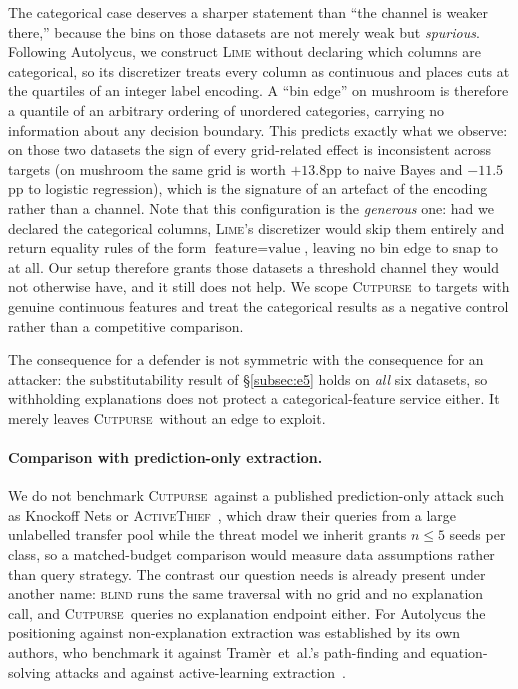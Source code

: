 \documentclass[sigconf,anonymous,review]{acmart}
\newcommand{\sys}{\textsc{Cutpurse}}
\begin{document}
The categorical case deserves a sharper statement than ``the channel is weaker there,'' because the
bins on those datasets are not merely weak but \emph{spurious}. Following Autolycus, we construct
\textsc{Lime} without declaring which columns are categorical, so its discretizer treats every column
as continuous and places cuts at the quartiles of an integer label encoding. A ``bin edge'' on
mushroom is therefore a quantile of an arbitrary ordering of unordered categories, carrying no
information about any decision boundary. This predicts exactly what we observe: on those two datasets
the sign of every grid-related effect is inconsistent across targets (on mushroom the same grid is worth $+13.8$pp to naive Bayes and $-11.5$pp to logistic regression), which is the signature of an
artefact of the encoding rather than a channel. Note that this configuration is the
\emph{generous} one: had we declared the categorical columns, \textsc{Lime}'s discretizer would skip
them entirely and return equality rules of the form $\text{feature}{=}\text{value}$, leaving no bin
edge to snap to at all. Our setup therefore grants those datasets a threshold channel they would not
otherwise have, and it still does not help. We scope \sys\ to targets with genuine continuous
features and treat the categorical results as a negative control rather than a competitive
comparison.

The consequence for a defender is not symmetric with the consequence for an attacker: the
substitutability result of \S\ref{subsec:e5} holds on \emph{all} six datasets, so withholding
explanations does not protect a categorical-feature service either. It merely leaves \sys\ without an
edge to exploit.

\paragraph{Comparison with prediction-only extraction.} We do not benchmark \sys\ against a
published prediction-only attack such as Knockoff Nets or
\textsc{ActiveThief}~\cite{orekondy2019knockoff,pal2020activethief}, which draw their queries from a
large unlabelled transfer pool while the threat model we inherit grants $n{\le}5$ seeds per class, so
a matched-budget comparison would measure data assumptions rather than query strategy. The contrast
our question needs is already present under another name: \textsc{blind} runs the same traversal with
no grid and no explanation call, and \sys\ queries no explanation endpoint either. For Autolycus the
positioning against non-explanation extraction was established by its own authors, who benchmark it
against Tram\`er~et~al.'s path-finding and equation-solving attacks and against active-learning
extraction~\cite{tramer2016stealing,chandrasekaran2020active}.
\end{document}
